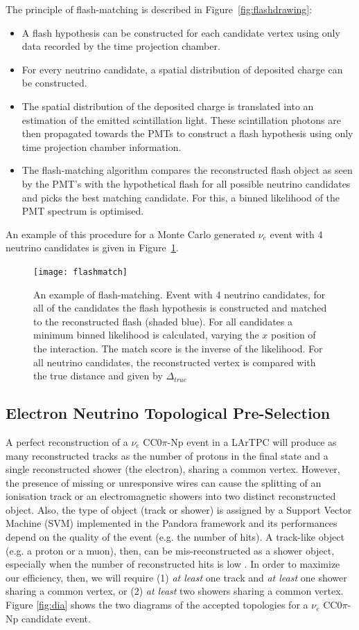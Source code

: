 The principle of flash-matching is described in Figure~\ref{fig:flashdrawing}:
\begin{itemize}
\item A flash hypothesis can be constructed for each candidate vertex using only data recorded by the time projection chamber.
\item For every neutrino candidate, a spatial distribution of deposited charge can be constructed.
\item The spatial distribution of the deposited charge is translated into an estimation of the emitted scintillation light. These scintillation photons are then propagated towards the PMTs to construct a flash hypothesis using only time projection chamber information.
\item The flash-matching algorithm compares the reconstructed flash object as seen by the PMT's with the hypothetical flash for all possible neutrino candidates and picks the best matching candidate. For this, a binned likelihood of the PMT spectrum is optimised.
\end{itemize}
An example of this procedure for a Monte Carlo generated $\nu_e$ event with 4 neutrino candidates is given in Figure~\ref{fig:flashmatch}.
\begin{figure}[!htbp]
\centering
\texttt{[image: flashmatch]} 
\caption{An example of flash-matching. Event with 4 neutrino candidates, for all of the candidates the flash hypothesis is constructed and matched to the reconstructed flash (shaded blue). For all candidates a minimum binned likelihood is calculated, varying the $x$ position of the interaction. The match score is the inverse of the likelihood. For all neutrino candidates, the reconstructed vertex is compared with the true distance and given by $\Delta_{true}$ } 
\label{fig:flashmatch}
\end{figure}

\subsection{Electron Neutrino Topological Pre-Selection}
A perfect reconstruction of a $\nu_{e}$ CC0$\pi$-Np event in a LArTPC will produce as many reconstructed tracks as the number of protons in the final state and a single reconstructed shower (the electron), sharing a common vertex. However, the presence of missing or unresponsive wires can cause the splitting of an ionisation track or an electromagnetic showers into two distinct reconstructed object. Also, the type of object (track or shower) is assigned by a Support Vector Machine (SVM) implemented in the Pandora framework and its performances depend on the quality of the event (e.g. the number of hits). A track-like object (e.g. a proton or a muon), then, can be mis-reconstructed as a shower object, especially when the number of reconstructed hits is low \cite{pandora2}. In order to maximize our efficiency, then, we will require (1) \emph{at least} one track and \emph{at least} one shower sharing a common vertex, or (2) \emph{at least} two showers sharing a common vertex. Figure \ref{fig:dia} shows the two diagrams of the accepted topologies for a $\nu_{e}$ CC0$\pi$-Np candidate event.

